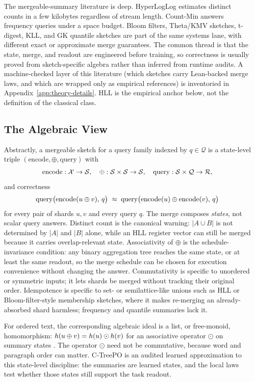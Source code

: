 The mergeable-summary literature is deep. HyperLogLog
\citep{FlajoletEtAl2007,HeuleEtAl2013} estimates distinct counts in a few
kilobytes regardless of stream length. Count-Min
\citep{CormodeMuthukrishnan2005} answers frequency queries under a space
budget. Bloom filters, Theta/KMV sketches, t-digest, KLL, and GK quantile
sketches are part of the same systems lane, with different exact or
approximate merge guarantees. The common thread is that the state,
merge, and readout are engineered before training, so correctness is
usually proved from sketch-specific algebra rather than inferred from
runtime audits. A machine-checked layer of this literature (which
sketches carry Lean-backed merge laws, and which are wrapped only as
empirical references) is inventoried in
Appendix~\ref{app:theory-details}. HLL is
the empirical anchor below, not the definition of the classical class.

\subsection{The Algebraic View}

Abstractly, a mergeable sketch for a query family indexed by $q \in \mathcal{Q}$
is a state-level triple $(\mathrm{encode}, \oplus, \mathrm{query})$ with
\[
\mathrm{encode} : \mathcal{X} \to \mathcal{S}, \quad
\oplus : \mathcal{S} \times \mathcal{S} \to \mathcal{S}, \quad
\mathrm{query} : \mathcal{S} \times \mathcal{Q} \to \mathcal{R},
\]
and correctness
\[
\mathrm{query}\big(\mathrm{encode}(u \oplus v),\, q\big)
\;\approx\;
\mathrm{query}\big(\mathrm{encode}(u) \oplus \mathrm{encode}(v),\, q\big)
\]
for every pair of shards $u, v$ and every query $q$. The merge composes
\emph{states}, not scalar query answers. Distinct count is the canonical
warning: $|A \cup B|$ is not determined by $|A|$ and $|B|$ alone, while an
HLL register vector can still be merged because it carries overlap-relevant
state. Associativity of $\oplus$ is the schedule-invariance condition: any
binary aggregation tree reaches the same state, or at least the same readout,
so the merge schedule can be chosen for execution convenience without
changing the answer. Commutativity is specific to unordered or symmetric
inputs; it lets shards be merged without tracking their original order.
Idempotence is specific to set- or semilattice-like unions such as HLL or
Bloom-filter-style membership sketches, where it makes re-merging an
already-absorbed shard harmless; frequency and quantile summaries lack it.

For ordered text, the corresponding algebraic ideal is a list, or free-monoid,
homomorphism: $h(u \oplus v) = h(u) \odot h(v)$ for an associative operator
$\odot$ on summary states \citep{Gibbons1996ThirdHomomorphism}. The operator
$\odot$ need not be commutative, because word and paragraph order can matter.
C-TreePO is an audited learned approximation to this state-level discipline:
the summaries are learned states, and the local laws test whether those states
still support the task readout.

